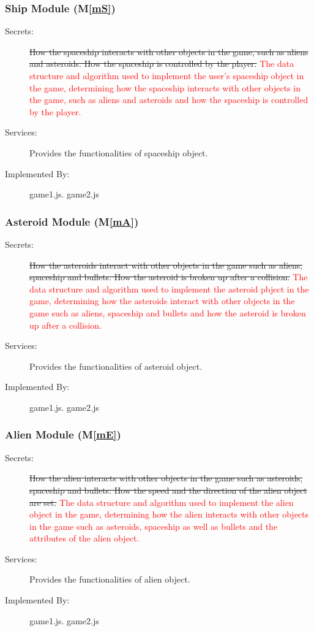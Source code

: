 \documentclass[12pt, titlepage]{article}
\newcommand{\mref}[1]{M\ref{#1}}
\begin{document}
\subsubsection{Ship Module  (\mref{mS})}

\begin{description}
\item[Secrets:]\sout{How the spaceship interacts with other objects in the game, such as aliens and asteroids. How the spaceship is controlled by the player.}
\textcolor{red}{The data structure and algorithm used to implement the user's spaceship object in the game, determining how the spaceship interacts with other objects in the game, such as aliens and asteroids and how the spaceship is controlled by the player.} 
\item[Services:]Provides the functionalities of spaceship object.
\item[Implemented By:] game1.js. game2.js
\end{description}

\subsubsection{Asteroid Module  (\mref{mA})}

\begin{description}
\item[Secrets:]\sout{How the asteroids interact with other objects in the game such as aliens, spaceship and bullets. How the asteroid is broken up after a collision.}
\textcolor{red}{The data structure and algorithm used to implement the asteroid pbject in the game, determining how the asteroids interact with other objects in the game such as aliens, spaceship and bullets and how the asteroid is broken up after a collision.} 
\item[Services:]Provides the functionalities of asteroid object.
\item[Implemented By:] game1.js. game2.js
\end{description}

\subsubsection{Alien Module  (\mref{mE})}

\begin{description}
\item[Secrets:]\sout{How the alien interacts with other objects in the game such as asteroids, spaceship and bullets. How the speed and the direction of the alien object are set.}
\textcolor{red}{The data structure and algorithm used to implement the alien object in the game, determining how the alien interacts with other objects in the game such as asteroids, spaceship as well as bullets and the attributes of the alien object.} 
\item[Services:]Provides the functionalities of alien object.
\item[Implemented By:] game1.js. game2.js
\end{description}
\end{document}
